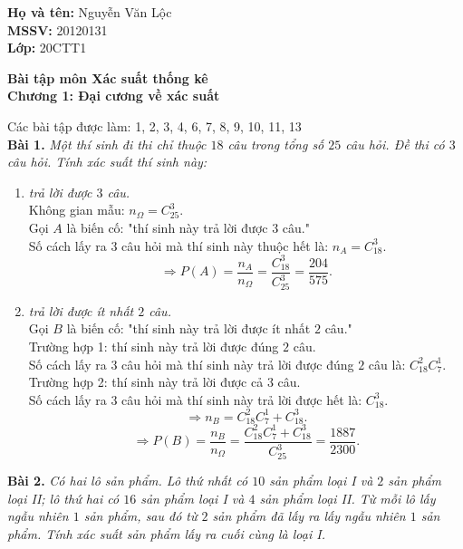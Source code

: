 \documentclass[12pt,a4paper]{article}
\author{Nguyễn Văn Lộc}
\begin{document}
\fancyhf{}
\lhead{}
\chead{}
\rhead{}
\cfoot{}
\rfoot{\thepage}
\lfoot{}
\pagestyle{fancy}
\renewcommand{\headrulewidth}{0pt}
\renewcommand{\footrulewidth}{0pt}
\begin{mybox}
\textbf{Họ và tên:} Nguyễn Văn Lộc\\
\textbf{MSSV:} 20120131\\
\textbf{Lớp:} 20CTT1
\end{mybox}
\begin{center}
\fontsize{16}{14}\selectfont
\textbf{Bài tập môn Xác suất thống kê}\\
\textbf{Chương 1: Đại cương về xác suất}
\end{center}
Các bài tập được làm: 1, 2, 3, 4, 6, 7, 8, 9, 10, 11, 13\\
\textbf{Bài 1.} \textit{Một thí sinh đi thi chỉ thuộc $18$ câu trong tổng số $25$ câu hỏi. Đề thi có $3$ câu hỏi. Tính xác suất thí sinh này:}
\begin{enumerate}[label=(\alph*)]
\item \textit{trả lời được $3$ câu.}\\
Không gian mẫu: $n_{\Omega} = C^3_{25}.$\\
Gọi $A$ là biến cố: "thí sinh này trả lời được $3$ câu."\\
Số cách lấy ra $3$ câu hỏi mà thí sinh này thuộc hết là: $n_A = C^3_{18}.$
$$\Rightarrow P\left( A \right) = \frac{{{n_A}}}{{{n_\Omega }}} = \frac{{C_{18}^3}}{{C_{25}^3}} = \frac{{204}}{{575}}.$$
\item \textit{trả lời được ít nhất $2$ câu.}\\
Gọi $B$ là biến cố: "thí sinh này trả lời được ít nhất $2$ câu."\\
Trường hợp 1: thí sinh này trả lời được đúng $2$ câu.\\
Số cách lấy ra $3$ câu hỏi mà thí sinh này trả lời được đúng $2$ câu là: $C^2_{18} C^1_{7}.$\\
Trường hợp 2: thí sinh này trả lời được cả $3$ câu.\\
Số cách lấy ra $3$ câu hỏi mà thí sinh này trả lời được hết là: $C^3_{18}.$\\
$$\Rightarrow n_B = C^2_{18} C^1_{7} + C^3_{18}.$$
$$ \Rightarrow P\left( B \right) = \frac{{{n_B}}}{{{n_\Omega }}} = \frac{{C_{18}^2C_7^1 + C_{18}^3}}{{C_{25}^3}} = \frac{{1887}}{{2300}}.$$
\end{enumerate}
\textbf{Bài 2.} \textit{Có hai lô sản phẩm. Lô thứ nhất có $10$ sản phẩm loại I và $2$ sản phẩm loại II; lô thứ hai có $16$ sản phẩm loại I và $4$ sản phẩm loại II. Từ mỗi lô lấy ngẫu nhiên $1$ sản phẩm, sau đó từ $2$ sản phẩm đã lấy ra lấy ngẫu nhiên $1$ sản phẩm. Tính xác suất sản phẩm lấy ra cuối cùng là loại I.}\\
\end{document}
